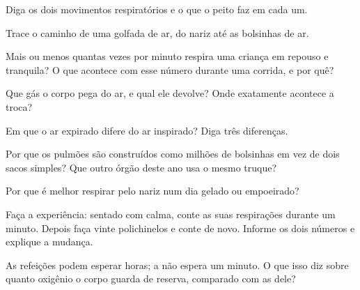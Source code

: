 \begin{exercise}[$\star$]\label{exo:g4:breathing:1}
Diga os dois movimentos respiratórios e o que o peito faz em cada
um.
\end{exercise}

\begin{exercise}[$\star$]\label{exo:g4:breathing:2}
Trace o caminho de uma golfada de ar, do nariz até as bolsinhas de ar.
\end{exercise}

\begin{exercise}[$\star$]\label{exo:g4:breathing:3}
Mais ou menos quantas vezes por minuto respira uma criança em
repouso e tranquila? O que acontece com esse número durante uma
corrida, e por quê?
\end{exercise}

\begin{exercise}[$\star$]\label{exo:g4:breathing:4}
Que gás o corpo pega do ar, e qual ele devolve? Onde exatamente
acontece a troca?
\end{exercise}

\begin{exercise}[$\star$]\label{exo:g4:breathing:5}
Em que o ar expirado difere do ar inspirado? Diga três diferenças.
\end{exercise}

\begin{exercise}[$\star$]\label{exo:g4:breathing:6}
Por que os pulmões são construídos como milhões de bolsinhas em vez
de dois sacos simples? Que outro órgão deste ano usa o mesmo truque?
\end{exercise}

\begin{exercise}[$\star$]\label{exo:g4:breathing:7}
Por que é melhor respirar pelo nariz num dia gelado ou empoeirado?
\end{exercise}

\begin{exercise}[$\star$]\label{exo:g4:breathing:8}
Faça a experiência: sentado com calma, conte as suas respirações
durante um minuto. Depois faça vinte polichinelos e conte de novo.
Informe os dois números e explique a mudança.
\end{exercise}

\begin{exercise}[$\star\star$]\label{exo:g4:breathing:9}
As refeições podem esperar horas; a  não espera um minuto.
O que isso diz sobre quanto oxigênio o corpo guarda de reserva,
comparado com as  dele?
\end{exercise}

